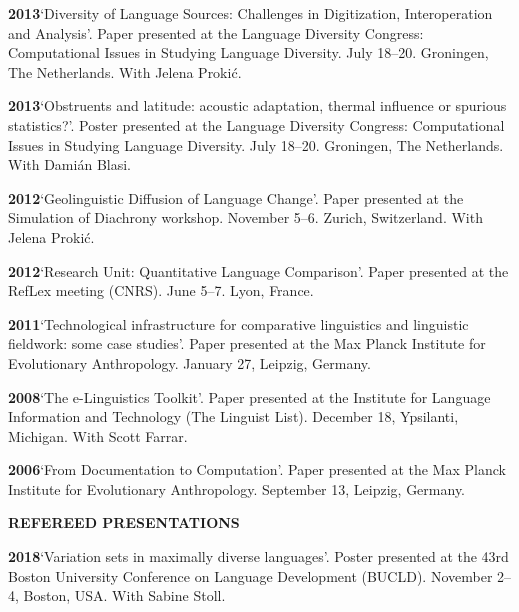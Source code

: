 \documentclass[11pt]{article}
\newcommand{\hangpara}{
 \setlength{\parindent}{0in} %
 \hangindent=0.42in %
}
\begin{document}
\vskip 6pt
\hangpara
{\bf 2013}\hspace{1ex}`Diversity of Language Sources: Challenges in Digitization, Interoperation and Analysis'. Paper presented at the Language Diversity Congress: Computational Issues in Studying Language Diversity. July 18--20. Groningen, The Netherlands. With Jelena Proki{\'c}.

\vskip 6pt
\hangpara
{\bf 2013}\hspace{1ex}`Obstruents and latitude: acoustic adaptation, thermal influence or spurious statistics?'. Poster presented at the Language Diversity Congress: Computational Issues in Studying Language Diversity. July 18--20. Groningen, The Netherlands. With Dami{\'a}n Blasi.

\vskip 6pt
\hangpara
{\bf 2012}\hspace{1ex}`Geolinguistic Diffusion of Language Change'. Paper presented at the Simulation of Diachrony workshop. November 5--6. Zurich, Switzerland. With Jelena Proki{\'c}.

\vskip 6pt
\hangpara
{\bf 2012}\hspace{1ex}`Research Unit: Quantitative Language Comparison'. Paper presented at the RefLex meeting (CNRS). June 5--7. Lyon, France. 

\vskip 6pt
\hangpara
{\bf 2011}\hspace{1ex}`Technological infrastructure for comparative linguistics and linguistic fieldwork: some case studies'. Paper presented at the Max Planck Institute for Evolutionary Anthropology. January 27, Leipzig, Germany. 

\vskip 6pt
\hangpara
{\bf 2008}\hspace{1ex}`The e-Linguistics Toolkit'. Paper presented at the Institute for Language Information and Technology (The Linguist List). December 18, Ypsilanti, Michigan. With Scott Farrar.

\vskip 6pt
\hangpara
{\bf 2006}\hspace{1ex}`From Documentation to Computation'. Paper presented at the Max Planck Institute for Evolutionary Anthropology. September 13, Leipzig, Germany.


\vskip 20pt
\begin{flushleft}
{\bf REFEREED PRESENTATIONS}
\end{flushleft}

\hangpara
{\bf 2018}\hspace{1ex}`Variation sets in maximally diverse languages'. Poster presented at the 43rd Boston University Conference on Language Development (BUCLD). November 2--4, Boston, USA. With Sabine Stoll.
\end{document}
